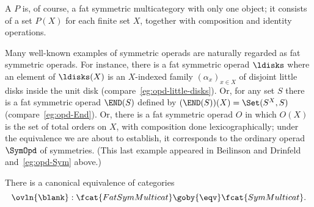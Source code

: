 \begin{example}
A %
%
%
$P$ is, of course, a fat symmetric
multicategory with only one object; it consists of a set $P(X)$ for each
finite set $X$, together with composition and identity operations.  

Many well-known examples of symmetric operads are naturally regarded as fat
symmetric operads.  For instance, there is a fat symmetric operad $\ldisks$
where an element of $\ldisks(X)$ is an $X$-indexed family $(\alpha_x)_{x\in
X}$ of disjoint little%
%
%
disks inside the unit disk
(compare~\ref{eg:opd-little-disks}).  Or, for any set $S$ there is a fat
symmetric operad $\END(S)$%
%
%
%
%
defined by $ (\END(S))(X) = \Set(S^X, S)$
(compare~\ref{eg:opd-End}).  Or, there is a fat symmetric operad $O$ in
which $O(X)$ is the set of total orders%
%
%
 on $X$, with composition done
lexicographically; under the equivalence we are about to establish, it
corresponds to the ordinary operad $\SymOpd$ of
symmetries.%
%
%
(This last example appeared in Beilinson%
%
%
and Drinfeld%
%
%
\cite[1.1.4]{BeDr}
and~\ref{eg:opd-Sym} above.)
\end{example}

\begin{thm}	
There is a canonical equivalence of categories
\[
\ovln{\blank}: \fcat{FatSymMulticat} \goby{\eqv} \fcat{SymMulticat}.
\]
\end{thm}

